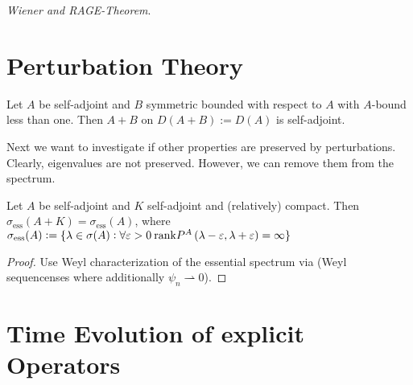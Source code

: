 \emph{Wiener and RAGE-Theorem}.

\section*{Perturbation Theory}

\begin{theorem}
	Let $A$ be self-adjoint and $B$ symmetric bounded with respect to $A$ with $A$-bound less than one. Then $A + B$ on $D(A + B) := D(A)$ is self-adjoint.
\end{theorem}

Next we want to investigate if other properties are preserved by perturbations. Clearly, eigenvalues are not preserved. However, we can remove them from the spectrum.

\begin{corollary}
	Let $A$ be self-adjoint and $K$ self-adjoint and (relatively) compact. Then $\sigma_{\mathrm{ess}}(A + K) = \sigma_{\mathrm{ess}}(A)$, where $\sigma_\mathrm{ess}(A) := \cbr[0]{\lambda \in \sigma(A) : \forall \varepsilon > 0 \>\mathrm{rank}P^A\intoo{\lambda-\varepsilon,\lambda + \varepsilon} = \infty}$ 
\end{corollary}

\begin{proof}
	Use Weyl characterization of the essential spectrum via  (Weyl sequencenses where additionally $\psi_n \rightharpoonup 0$).
\end{proof}

\section*{Time Evolution of explicit Operators}

